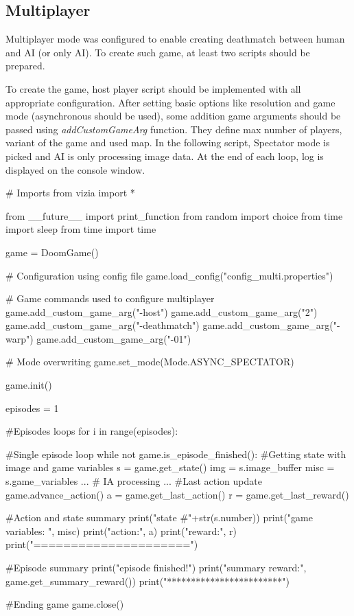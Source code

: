 \documentclass[english,bachelor,a4paper,twoside]{ppfcmthesis}
\begin{document}
\subsection {Multiplayer}
	Multiplayer mode was configured to enable creating deathmatch between human and AI (or only AI). To create such game, at least two scripts should be prepared.


	To create the game, host player script should be implemented with all appropriate configuration. After setting basic options like resolution and game mode (asynchronous should be used), some addition game arguments should be passed using \emph{addCustomGameArg} function. They define max number of players, variant of the game and used map. In the following script, Spectator mode is picked and AI is only processing image data. At the end of each loop, log is displayed on the console window.

\begin{pblock}
# Imports
from vizia import *

from __future__ import print_function
from random import choice
from time import sleep
from time import time

game = DoomGame()

# Configuration using config file
game.load_config("config_multi.properties")

# Game commands used to configure multiplayer
game.add_custom_game_arg("-host")
game.add_custom_game_arg("2")
game.add_custom_game_arg("-deathmatch")
game.add_custom_game_arg("-warp")
game.add_custom_game_arg("-01")

# Mode overwriting 
game.set_mode(Mode.ASYNC_SPECTATOR)

game.init()
	
episodes = 1

#Episodes loops
for i in range(episodes):

	#Single episode loop
	while not game.is_episode_finished():
		#Getting state with image and game variables	
		s = game.get_state()
		img = s.image_buffer
		misc = s.game_variables
		...
		# IA processing
		...	
		#Last action update
		game.advance_action()
		a = game.get_last_action()
		r = game.get_last_reward()
			
		#Action and state summary
		print("state #"+str(s.number))
		print("game variables: ", misc)
		print("action:", a)
		print("reward:", r)
		print("=====================")

	#Episode summary	
	print("episode finished!")
	print("summary reward:", game.get_summary_reward())
	print("************************")

#Ending game
game.close()
\end{pblock}
\end{document}
